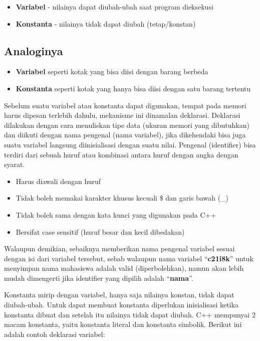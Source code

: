 \begin{itemize}
\item \textbf{Variabel} - nilainya dapat diubah-ubah saat program dieksekusi
\item \textbf{Konstanta} - nilainya tidak dapat diubah (tetap/konstan)
\end{itemize}

\subsection{Analoginya}

\begin{itemize}
\item \textbf{Variabel} seperti kotak yang bisa diisi dengan barang berbeda
\item \textbf{Konstanta} seperti kotak yang hanya bisa diisi dengan satu barang tertentu
\end{itemize}

Sebelum suatu variabel atau konstanta dapat digunakan, tempat pada
memori harus dipesan terlebih dahulu, mekanisme ini dinamalan deklarasi.
Deklarasi dilakukan dengan cara menuliskan tipe data (ukuran memori yang
dibutuhkan) dan diikuti dengan nama pengenal (nama variabel), jika
dikehendaki bisa juga suatu variabel langsung diinisialisasi dengan
suatu nilai. Pengenal (identifier) bisa terdiri dari sebuah huruf atau
kombinasi antara huruf dengan angka dengan syarat.

\begin{itemize}

\item
 Harus diawali dengan huruf
\item
 Tidak boleh memakai karakter khusus kecuali \$ dan garis bawah (\_)
\item
 Tidak boleh sama dengan kata kunci yang digunakan pada C++
\item
 Bersifat case sensitif (huruf besar dan kecil dibedakan)
\end{itemize}

Walaupun demikian, sebaiknya memberikan nama pengenal variabel sesuai
dengan isi dari variabel tersebut, sebab walaupun nama variabel
``\textbf{c21i8k}'' untuk menyimpan nama mahasiswa adalah valid
(diperbolehkan), namun akan lebih mudah dimengerti jika identifier yang
dipilih adalah ``\textbf{nama}''.

Konstanta mirip dengan variabel, hanya saja nilainya konstan, tidak
dapat diubah-ubah. Untuk dapat membuat konstanta diperlukan inisialisasi
ketika konstanta dibuat dan setelah itu nilainya tidak dapat diubah. C++
mempunyai 2 macam konstanta, yaitu konstanta literal dan konstanta
simbolik. Berikut ini adalah contoh deklarasi variabel:

